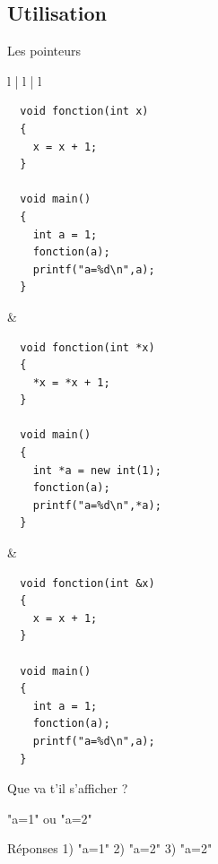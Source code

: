 \documentclass{beamer}
\begin{document}
\subsection*{Utilisation}
\begin{frame}[fragile]{Les pointeurs}
  \hspace{-12mm}
  \begin{tabular}{l | l | l}
    \begin{minipage}{0.33\linewidth}
      \begin{scriptsize}
\begin{verbatim}
  void fonction(int x)
  {
    x = x + 1;
  }

  void main()
  {
    int a = 1;
    fonction(a);
    printf("a=%d\n",a);
  }
\end{verbatim}
      \end{scriptsize}
    \end{minipage}
    &
    \begin{minipage}{0.33\linewidth}
      \begin{scriptsize}
\begin{verbatim}
  void fonction(int *x)
  {
    *x = *x + 1;
  }

  void main()
  {
    int *a = new int(1);
    fonction(a);
    printf("a=%d\n",*a);
  }
\end{verbatim}
      \end{scriptsize}
    \end{minipage}
    &
    \begin{minipage}{0.33\linewidth}
      \begin{scriptsize}
\begin{verbatim}
  void fonction(int &x)
  {
    x = x + 1;
  }

  void main()
  {
    int a = 1;
    fonction(a);
    printf("a=%d\n",a);
  }
\end{verbatim}
      \end{scriptsize}
    \end{minipage}
  \end{tabular}

  \vspace{5mm}
  
  \begin{block}{
      Que va t'il s'afficher ?}
    \begin{center}
      "a=1" ou "a=2"
    \end{center}
  \end{block}
  
  \pause
  \begin{block}{Réponses}
  1) "a=1" \hfill 2) "a=2" \hfill 3) "a=2"
  \end{block}
\end{frame}
\end{document}
